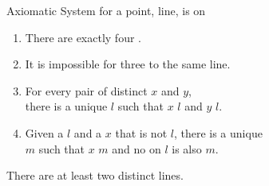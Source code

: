 

\begin{frame}{}
  \begin{exampleblock}{Axiomatic System for a }
     point, line, is on

    \vspace{0.50cm}
    \begin{enumerate}[(1)]
      \item There are exactly four .
      \item It is impossible for three  to  the same line.
      \item For every pair of distinct  $x$ and $y$, \\
        there is a unique  $l$ such that $x$  $l$
        and $y$  $l$.
      \item Given a  $l$ and a  $x$ that is not  $l$,
        there is a unique \\  $m$ such that $x$  $m$
        and no  on $l$ is also  $m$.
    \end{enumerate}
  \end{exampleblock}

  \pause
  \vspace{0.30cm}
  \begin{theorem}
    There are at least two distinct lines.
  \end{theorem}
\end{frame}


